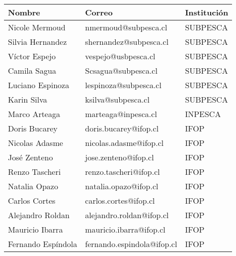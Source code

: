 
\begin{table}[h]
    \centering
    \begin{tabular}{|p{3.5cm}|p{6cm}|p{4cm}|}
        \hline
        \textbf{Nombre} & \textbf{Correo} & \textbf{Institución} \\
        \hline
        Nicole Mermoud &nmermoud@subpesca.cl & SUBPESCA\\
        \hline
        Silvia Hernandez & shernandez@subpesca.cl & SUBPESCA\\
        \hline
        Víctor Espejo & vespejo@usbpesca.cl &  SUBPESCA\\
        \hline
        Camila Sagua & Scsagua@subpesca.cl & SUBPESCA\\
        \hline
        Luciano Espinoza & lespinoza@subpesca.cl & SUBPESCA\\
        \hline
        Karin Silva & ksilva@subpesca.cl & SUBPESCA\\
        \hline
        Marco Arteaga & marteaga@inpesca.cl & INPESCA\\
        \hline
        Doris Bucarey & doris.bucarey@ifop.cl & IFOP\\
        \hline
        Nicolas Adasme & nicolas.adasme@ifop.cl &  IFOP\\
        \hline
        José Zenteno & jose.zenteno@ifop.cl & IFOP\\
        \hline
        Renzo Tascheri & renzo.tascheri@ifop.cl & IFOP\\
        \hline
        Natalia Opazo & natalia.opazo@ifop.cl & IFOP\\
        \hline
        Carlos Cortes & carlos.cortes@ifop.cl &  IFOP\\
        \hline
        Alejandro Roldan & alejandro.roldan@ifop.cl & IFOP\\
        \hline
        Mauricio Ibarra & mauricio.ibarra@ifop.cl & IFOP\\
        \hline
        Fernando Espíndola & fernando.espindola@ifop.cl & IFOP\\
        \hline
    \end{tabular}
\end{table}

